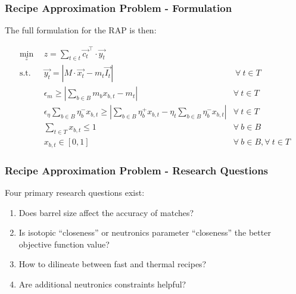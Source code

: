 \begin{frame}[ctb!]
  \frametitle{Recipe Approximation Problem - Formulation}

  The full formulation for the RAP is then:

  \begin{subequations}\label{eqs:rap}
    \begin{align}
      \min_{z} \:\: & 
      z = \sum_{t \in t} \vec{c_{t}}^{\top} \cdot \vec{y_{t}}
      & \label{eqs:rap_obj} \\
      \text{s.t.} \:\: &
      \vec{y_{t}} = \left| M \cdot \vec{x_{t}}  - m_t \vec{I_{t}} \right|
      &
      \: \forall \: t \in T \label{eqs:rap_iso} \\
      &
      \epsilon_{m} \geq \left| \sum_{b \in B} m_{b} x_{b, t} - m_{t} \right|
      & 
      \forall \: t \in T \label{eqs:rap_mass} \\
      &
      \epsilon_{\eta} \sum_{b \in B} \eta_{b}^{-} x_{b, t} \geq 
      \left| \sum_{b \in B} \eta_{b}^{+} x_{b, t} - 
      \eta_{t} \sum_{b \in B} \eta_{b}^{-} x_{b, t} \right|
      & 
      \forall \: t \in T \label{eqs:rap_eta} \\
      &
      \sum_{t \in T} x_{b, t} \leq 1
      & 
      \forall \: b \in B \label{eqs:rap_conserv} \\
      &
      x_{b, t} \in \left[ 0, 1 \right]
      & 
      \forall \: b \in B, \forall \: t \in T  \label{eqs:rap_x}
    \end{align}
  \end{subequations}
\end{frame}

\begin{frame}[ctb!]
  \frametitle{Recipe Approximation Problem - Research Questions} 

  Four primary research questions exist:

  \begin{enumerate}
    \item Does barrel size affect the accuracy of matches?
    \item Is isotopic ``closeness'' or neutronics parameter ``closeness'' the
      better objective function value?
    \item How to dilineate between fast and thermal recipes?
    \item Are additional neutronics constraints helpful?
  \end{enumerate}
\end{frame}

